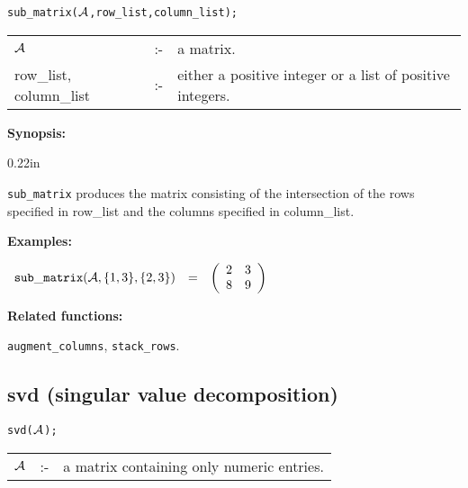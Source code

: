 
\hspace*{0.175in} {\tt sub\_matrix(${\cal A}$,row\_list,column\_list);}

\hspace*{0.1in}  
\begin{tabular}{l l l} 
${\cal A}$              &:-& a matrix. \\
row\_list, column\_list &:-& \parbox[t]{.605\linewidth}{either a 
positive integer or a list of positive integers.}
\end{tabular}

{\bf Synopsis:} %


\begin{addtolength}{\leftskip}{0.22in}

{\tt sub\_matrix} produces the matrix consisting of the
              intersection of the rows specified in row\_list and the 
columns specified in column\_list. 

\end{addtolength}

{\bf Examples:}

\begin{flushleft}  
\hspace*{0.1in}
\begin{math}  
\begin{array}{ccc}
{\tt sub\_matrix}({\cal A},\{1,3\},\{2,3\}) & = & 
        \left( \begin{array}{cc} 2 & 3 \\ 8 & 9
 \end{array} \right) 
\end{array}
\end{math}  
\end{flushleft}

{\bf Related functions:}

\hspace*{0.175in} {\tt augment\_columns}, {\tt stack\_rows}.


\subsection{svd (singular value decomposition)}


\hspace*{0.175in} {\tt svd(${\cal A}$);}

\hspace*{0.1in}  
\begin{tabular}{l l l} 
${\cal A}$ &:-& a matrix containing only numeric entries.
\end{tabular}

